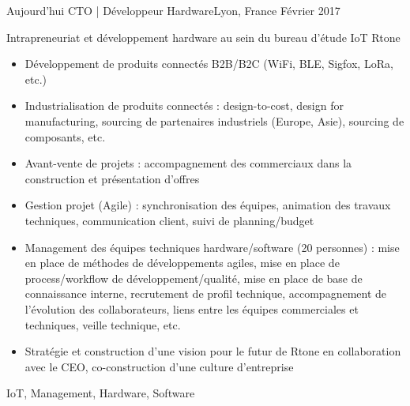 %
%
%

\begin{experiences}
  \experience
    {Aujourd'hui}   {CTO | Développeur Hardware}{}{Lyon, France}
    {Février 2017} {
                      Intrapreneuriat et développement hardware au sein du bureau d'étude IoT Rtone
                      \begin{itemize}
                        \item Développement de produits connectés B2B/B2C (WiFi, BLE, Sigfox, LoRa, etc.)
                        \item Industrialisation de produits connectés : design-to-cost, design for manufacturing, sourcing de partenaires industriels (Europe, Asie), sourcing de composants, etc.
                        \item Avant-vente de projets : accompagnement des commerciaux dans la construction et présentation d'offres
                        \item Gestion projet (Agile) : synchronisation des équipes, animation des travaux techniques, communication client, suivi de planning/budget
                        \item Management des équipes techniques hardware/software (20 personnes) : mise en place de méthodes de développements agiles, mise en place de process/workflow de développement/qualité, mise en place de base de connaissance interne, recrutement de profil technique, accompagnement de l'évolution des collaborateurs, liens entre les équipes commerciales et techniques, veille technique, etc.
                        \item Stratégie et construction d'une vision pour le futur de Rtone en collaboration avec le CEO, co-construction d'une culture d'entreprise
                      \end{itemize}
                    }
                    {IoT, Management, Hardware, Software}
                    
  \emptySeparator


\end{experiences}
